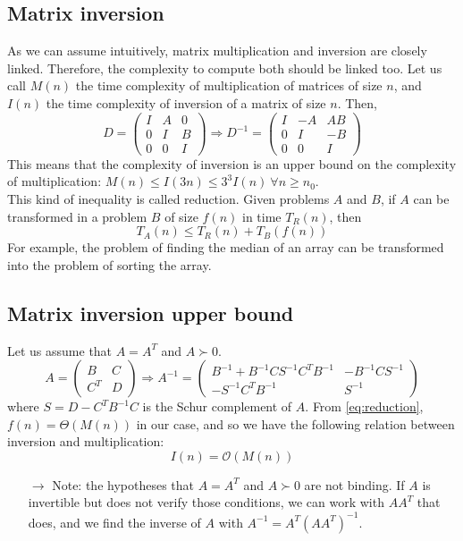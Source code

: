 \documentclass[12pt, openany]{report}
\theoremstyle{definition}
\begin{document}
\subsection{Matrix inversion}
As we can assume intuitively, matrix multiplication and inversion are closely linked. Therefore, the complexity to compute both should be linked too. Let us call $M(n)$ the time complexity of multiplication of matrices of size $n$, and $I(n)$ the time complexity of inversion of a matrix of size $n$. Then,
\begin{equation}
	D = \begin{pmatrix}
		I & A & 0 \\ 0 & I & B \\ 0 & 0 & I
	\end{pmatrix}\Longrightarrow D^{-1} = \begin{pmatrix}
		I & -A & AB \\ 0 & I & -B \\ 0 & 0 & I
	\end{pmatrix}
\end{equation}
This means that the complexity of inversion is an upper bound on the complexity of multiplication: $M(n)\le I(3n)\le 3^3I(n) \ \forall n\ge n_0$.\\
This kind of inequality is called reduction. Given problems $A$ and $B$, if $A$ can be transformed in a problem $B$ of size $f(n)$ in time $T_R(n)$, then 
\begin{equation}\label{eq:reduction}
	T_A(n) \le T_R(n) + T_B(f(n))
\end{equation}
For example, the problem of finding the median of an array can be transformed into the problem of sorting the array.\\
\subsection{Matrix inversion upper bound}
Let us assume that $A=A^T$ and $A\succ 0$.
\begin{equation}
	A = \begin{pmatrix}
		B & C \\ C^T & D
	\end{pmatrix} \Longrightarrow A^{-1} = \begin{pmatrix}
		B^{-1} + B^{-1}CS^{-1}C^TB^{-1} & -B^{-1}CS^{-1}\\
		- S^{-1}C^TB^{-1} & S^{-1}
	\end{pmatrix}
\end{equation}
where $S = D-C^TB^{-1}C$ is the Schur complement of $A$. From \autoref{eq:reduction}, $f(n) = \Theta(M(n))$ in our case, and so we have the following relation between inversion and multiplication:
\begin{equation}
	I(n) = \mathcal{O}(M(n))
\end{equation}
\begin{itemize}
	\item [$\rightarrow$] Note: the hypotheses that $A=A^T$ and $A\succ 0$ are not binding. If $A$ is invertible but does not verify those conditions, we can work with $AA^T$ that does, and we find the inverse of $A$ with $A^{-1} = A^T(AA^T)^{-1}$. 
\end{itemize}
\end{document}
